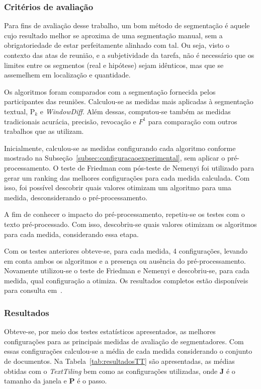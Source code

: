 \subsubsection{Critérios de avaliação}

Para fins de avaliação desse trabalho, um bom método de segmentação é aquele cujo resultado melhor se aproxima de uma segmentação manual, sem a obrigatoriedade de estar perfeitamente alinhado com tal. Ou seja, visto o contexto das atas de reunião, e a subjetividade da tarefa, não é necessário que os limites entre os segmentos (real e hipótese) sejam idênticos, mas que se assemelhem em localização e quantidade.


Os algoritmos foram comparados com a segmentação fornecida pelos participantes das reuniões. Calculou-se as medidas mais aplicadas à segmentação textual, P$_k$ e \textit{WindowDiff}. Além dessas, computou-se também as medidas tradicionais acurácia, precisão, revocação e $F^1$ para comparação com outros trabalhos que as utilizam.

Inicialmente, calculou-se as medidas configurando cada algoritmo conforme mostrado na Subseção~\ref{subsec:configuracaoexperimental}, sem aplicar o pré-processamento. O teste de Friedman com pós-teste de Nemenyi foi utilizado para gerar um ranking das melhores configurações para cada medida calculada. Com isso, foi possível descobrir quais valores otimizam um algoritmo para uma medida, 	desconsiderando o pré-processamento. 

A fim de conhecer o impacto do pré-processamento, repetiu-se os testes com o texto pré-processado. Com isso, descobriu-se quais valores otimizam os algoritmos para cada medida, considerando essa etapa.

Com os testes anteriores obteve-se, para cada medida, 4 configurações, levando em conta ambos os algoritmos e a presença ou ausência do pré-processamento. Novamente utilizou-se o teste de Friedman e Nemenyi e descobriu-se, para cada medida, qual configuração a otimiza. Os resultados completos estão disponíveis para consulta em~\urlsoftwares.




\subsubsection{Resultados}


Obteve-se, por meio dos testes estatísticos apresentados, as melhores configurações para as principais medidas de avaliação de segmentadores. Com essas configurações calculou-se a média de cada medida considerando o conjunto de documentos. Na Tabela~\ref{tab:resultadosTT} são apresentadas, as médias obtidas com o \textit{TextTiling} bem como as configurações utilizadas, onde \textbf{J} é o tamanho da janela e \textbf{P} é o passo.


